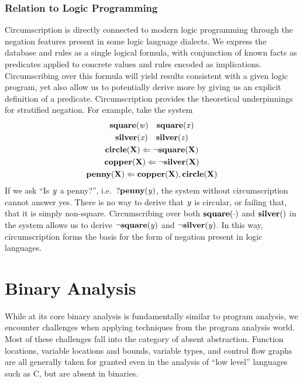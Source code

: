 \subsubsection{Relation to Logic Programming}
Circumscription is directly connected to modern logic programming through the negation features present in some logic language dialects.
We express the database and rules as a single logical formula, with conjunction of known facts as predicates applied to concrete values and rules encoded as implications.
Circumscribing over this formula will yield results consistent with a given logic program, yet also allow us to potentially derive more by giving us an explicit definition of a predicate.
Circumscription provides the theoretical underpinnings for stratified negation.
For example, take the system
\begin{gather*}
        {\bf square}({\it w}) \quad {\bf square}({\it x})\\
        {\bf silver}({\it x}) \quad {\bf silver}({\it z})\\
        {\bf circle}({\bf X}) \Leftarrow \neg {\bf square}({\bf X})\\
        {\bf copper}({\bf X}) \Leftarrow \neg {\bf silver}({\bf X})\\
        {\bf penny}({\bf X}) \Leftarrow {\bf copper}({\bf X}), {\bf circle}({\bf X})\\
\end{gather*}
If we ask ``Is ${\it y}$ a penny?'', i.e.\ $?{\bf penny}({\it y})$, the system without circumscription cannot answer yes.
There is no way to derive that ${\it y}$ is circular, or failing that, that it is simply non-square.
Circumscribing over both ${\bf square}(\cdot)$ and $\pred{silver}$ in the system allows us to derive $\neg {\bf square}({\it y})$ and $\neg {\bf silver}({\it y})$.
In this way, circumscription forms the basis for the form of negation present in logic languages.

\section{Binary Analysis}
While at its core binary analysis is fundamentally similar to program analysis, we encounter challenges when applying techniques from the program analysis world.
Most of these challenges fall into the category of absent abstraction.
Function locations, variable locations and bounds, variable types, and control flow graphs are all generally taken for granted even in the analysis of ``low level'' languages such as C, but are absent in binaries.

